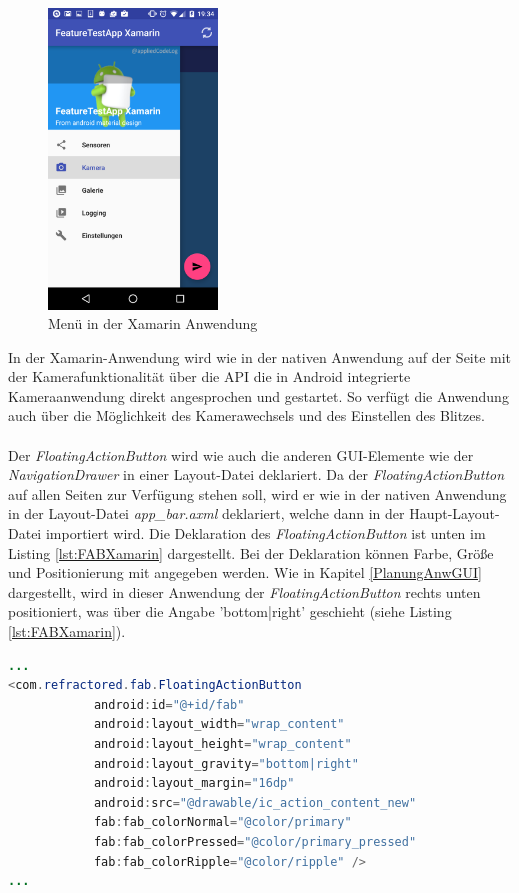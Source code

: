 \begin{figure}[h]
	\centering
	\includegraphics[width=0.4\textwidth]{Bilder/Screenshot_20170328-193448.PNG}
	\caption{Menü in der Xamarin Anwendung}
	\label{fig:MenuXamarin}
\end{figure}

In der Xamarin-Anwendung wird wie in der nativen Anwendung auf der Seite mit der Kamerafunktionalität über die API die in Android integrierte Kameraanwendung direkt angesprochen und gestartet. So verfügt die Anwendung auch über die Möglichkeit des Kamerawechsels und des Einstellen des Blitzes. 
\\
\\
Der \textit{FloatingActionButton} wird wie auch die anderen GUI-Elemente wie der \textit{NavigationDrawer} in einer Layout-Datei deklariert. Da der \textit{FloatingActionButton} auf allen Seiten zur Verfügung stehen soll, wird er wie in der nativen Anwendung in der Layout-Datei \textit{app\_bar.axml} deklariert, welche dann in der Haupt-Layout-Datei importiert wird. Die Deklaration des \textit{FloatingActionButton} ist unten im Listing \ref{lst:FABXamarin} dargestellt. Bei der Deklaration können Farbe, Größe und Positionierung mit angegeben werden. Wie in Kapitel \ref{PlanungAnwGUI} dargestellt, wird in dieser Anwendung der \textit{FloatingActionButton} rechts unten positioniert, was über die Angabe 'bottom|right' geschieht (siehe Listing \ref{lst:FABXamarin}). 
\clearpage

\begin{lstlisting}[caption=Deklaration des \textit{FloatingActionButton} in der Datei \textit{app\_bar.axml}, label=lst:FABXamarin, language=Java]
...
<com.refractored.fab.FloatingActionButton
            android:id="@+id/fab"
            android:layout_width="wrap_content"
            android:layout_height="wrap_content"
            android:layout_gravity="bottom|right"
            android:layout_margin="16dp"
            android:src="@drawable/ic_action_content_new"
            fab:fab_colorNormal="@color/primary"
            fab:fab_colorPressed="@color/primary_pressed"
            fab:fab_colorRipple="@color/ripple" />
...
\end{lstlisting}

